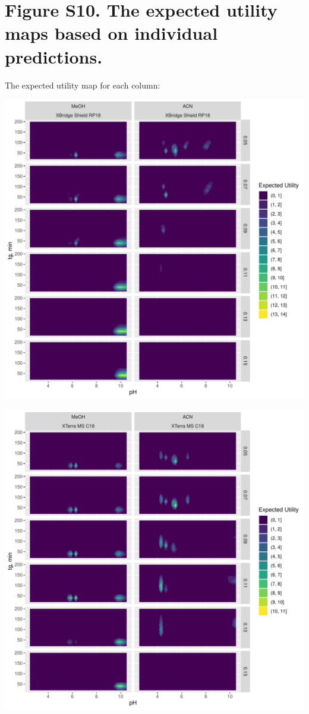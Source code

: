 \documentclass[
]{article}
\begin{document}
\newpage{}

\hypertarget{figure-s10.-the-expected-utility-maps-based-on-individual-predictions.}{%
\section{Figure S10. The expected utility maps based on individual
predictions.}\label{figure-s10.-the-expected-utility-maps-based-on-individual-predictions.}}

The expected utility map for each column:

\includegraphics{../figures/casestudy1/utilitymap/utilitymap1.pdf}

\newpage{}

\includegraphics{../figures/casestudy1/utilitymap/utilitymap2.pdf}
\end{document}
